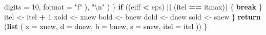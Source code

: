 \documentclass[12pt,]{article}
\newenvironment{Shaded}{\begin{snugshade}}{\end{snugshade}}
\newcommand{\KeywordTok}[1]{\textcolor[rgb]{0.13,0.29,0.53}{\textbf{#1}}}
\newcommand{\DataTypeTok}[1]{\textcolor[rgb]{0.13,0.29,0.53}{#1}}
\newcommand{\DecValTok}[1]{\textcolor[rgb]{0.00,0.00,0.81}{#1}}
\newcommand{\CharTok}[1]{\textcolor[rgb]{0.31,0.60,0.02}{#1}}
\newcommand{\StringTok}[1]{\textcolor[rgb]{0.31,0.60,0.02}{#1}}
\newcommand{\ControlFlowTok}[1]{\textcolor[rgb]{0.13,0.29,0.53}{\textbf{#1}}}
\newcommand{\OperatorTok}[1]{\textcolor[rgb]{0.81,0.36,0.00}{\textbf{#1}}}
\newcommand{\NormalTok}[1]{#1}
\begin{document}
\begin{Shaded}
\begin{Highlighting}[]
            \DataTypeTok{digits =} \DecValTok{10}\NormalTok{,}
            \DataTypeTok{format =} \StringTok{"f"}
\NormalTok{          ),}
          \StringTok{"}\CharTok{\textbackslash{}n}\StringTok{"}
\NormalTok{        )}
\NormalTok{      \}}
      \ControlFlowTok{if}\NormalTok{ ((eiff }\OperatorTok{<}\StringTok{ }\NormalTok{eps) }\OperatorTok{||}\StringTok{ }\NormalTok{(itel }\OperatorTok{==}\StringTok{ }\NormalTok{itmax)) \{}
        \ControlFlowTok{break}
\NormalTok{      \}}
\NormalTok{      itel <-}\StringTok{ }\NormalTok{itel }\OperatorTok{+}\StringTok{ }\DecValTok{1}
\NormalTok{      xold <-}\StringTok{ }\NormalTok{xnew}
\NormalTok{      bold <-}\StringTok{ }\NormalTok{bnew}
\NormalTok{      dold <-}\StringTok{ }\NormalTok{dnew}
\NormalTok{      sold <-}\StringTok{ }\NormalTok{snew}
\NormalTok{    \}}
    \KeywordTok{return}\NormalTok{ (}\KeywordTok{list}\NormalTok{ (}
      \DataTypeTok{x =}\NormalTok{ xnew,}
      \DataTypeTok{d =}\NormalTok{ dnew,}
      \DataTypeTok{b =}\NormalTok{ bnew,}
      \DataTypeTok{s =}\NormalTok{ snew,}
      \DataTypeTok{itel =}\NormalTok{ itel}
\NormalTok{    ))}
\NormalTok{  \}}


\end{Highlighting}
\end{Shaded}
\end{document}

